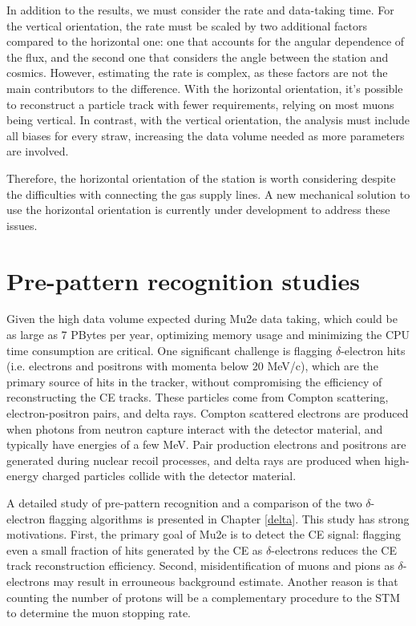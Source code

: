 In addition to the results, we must consider the rate and data-taking time. 
For the vertical orientation, the rate must be scaled by two additional 
factors compared to the horizontal one: one that accounts for the 
angular dependence of the flux, and the second one that considers the angle between the station and cosmics. 
However, estimating the rate is complex, as these factors are not the main contributors to the difference. 
With the horizontal orientation, it's possible to reconstruct a particle track with 
fewer requirements, relying on most muons being vertical. In contrast, with the 
vertical orientation, the analysis must include all biases for every straw, increasing 
the data volume needed as more parameters are involved.

Therefore, the horizontal orientation of the station is worth considering despite the difficulties
with connecting the gas supply lines.
A new mechanical solution to use the horizontal orientation is currently under development to address these issues.




\section{Pre-pattern recognition studies}

Given the high data volume expected during Mu2e data taking, 
which could be as large as 7 PBytes per year,
optimizing memory usage and minimizing the CPU time consumption are critical.
One significant challenge is flagging $\delta$-electron hits (i.e. electrons and positrons 
with momenta below 20 MeV/c), which are the primary source 
of hits in the tracker, without compromising the efficiency of 
reconstructing the CE tracks. These particles come from Compton 
scattering, electron-positron pairs, 
and delta rays. Compton scattered electrons 
are produced when photons from neutron capture interact with the 
detector material, and typically have energies of a few MeV.
Pair production electrons and positrons 
are generated during nuclear recoil processes, and delta rays are produced 
when high-energy charged particles collide with the detector material.

A detailed study of pre-pattern recognition and a comparison of the two 
$\delta$-electron flagging algorithms is presented 
in Chapter \ref{delta}. This study has strong motivations. First, the primary goal of Mu2e is 
to detect the CE signal: flagging even a small fraction of hits generated 
by the CE as $\delta$-electrons reduces the CE track 
reconstruction efficiency. Second, misidentification of muons 
and pions as $\delta$-electrons may result in errouneous background estimate. 
Another reason is that counting the number of protons will be a complementary procedure to the 
STM to determine the muon stopping rate.


